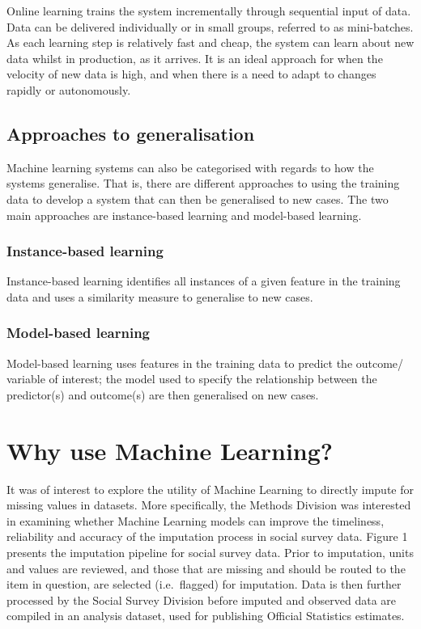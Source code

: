 \documentclass[]{book}
\begin{document}
Online learning trains the system incrementally through sequential input
of data. Data can be delivered individually or in small groups, referred
to as mini-batches. As each learning step is relatively fast and cheap,
the system can learn about new data whilst in production, as it arrives.
It is an ideal approach for when the velocity of new data is high, and
when there is a need to adapt to changes rapidly or autonomously.

\section{Approaches to
generalisation}\label{approaches-to-generalisation}

Machine learning systems can also be categorised with regards to how the
systems generalise. That is, there are different approaches to using the
training data to develop a system that can then be generalised to new
cases. The two main approaches are instance-based learning and
model-based learning.

\subsection{Instance-based learning}\label{instance-based-learning}

Instance-based learning identifies all instances of a given feature in
the training data and uses a similarity measure to generalise to new
cases.

\subsection{Model-based learning}\label{model-based-learning}

Model-based learning uses features in the training data to predict the
outcome/ variable of interest; the model used to specify the
relationship between the predictor(s) and outcome(s) are then
generalised on new cases.

\chapter{Why use Machine Learning?}\label{why-use-machine-learning}

It was of interest to explore the utility of Machine Learning to
directly impute for missing values in datasets. More specifically, the
Methods Division was interested in examining whether Machine Learning
models can improve the timeliness, reliability and accuracy of the
imputation process in social survey data. Figure 1 presents the
imputation pipeline for social survey data. Prior to imputation, units
and values are reviewed, and those that are missing and should be routed
to the item in question, are selected (i.e.~flagged) for imputation.
Data is then further processed by the Social Survey Division before
imputed and observed data are compiled in an analysis dataset, used for
publishing Official Statistics estimates.
\end{document}

